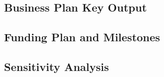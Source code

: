\documentclass[a4paper,11pt]{article}
\begin{document}
\subsection{Business Plan Key Output}
\subsection{Funding Plan and Milestones}
\subsection{Sensitivity Analysis}
\end{document}

